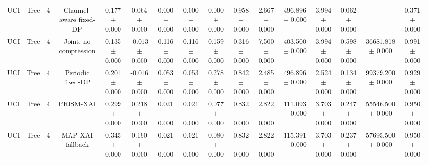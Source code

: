 \begin{tabular}{lccccccccccccccc}
UCI & Tree & 4 & Channel-aware fixed-DP & 0.177 $\pm$ 0.000 & 0.064 $\pm$ 0.000 & 0.000 $\pm$ 0.000 & 0.000 $\pm$ 0.000 & 0.000 $\pm$ 0.000 & 0.958 $\pm$ 0.000 & 2.667 $\pm$ 0.000 & 496.896 $\pm$ 0.000 & 3.994 $\pm$ 0.000 & 0.062 $\pm$ 0.000 & -- & 0.371 $\pm$ 0.000 \\
UCI & Tree & 4 & Joint, no compression & 0.135 $\pm$ 0.000 & -0.013 $\pm$ 0.000 & 0.116 $\pm$ 0.000 & 0.116 $\pm$ 0.000 & 0.159 $\pm$ 0.000 & 0.316 $\pm$ 0.000 & 7.500 $\pm$ 0.000 & 403.500 $\pm$ 0.000 & 3.994 $\pm$ 0.000 & 0.598 $\pm$ 0.000 & 36681.818 $\pm$ 0.000 & 0.991 $\pm$ 0.000 \\
UCI & Tree & 4 & Periodic fixed-DP & 0.201 $\pm$ 0.000 & -0.016 $\pm$ 0.000 & 0.053 $\pm$ 0.000 & 0.053 $\pm$ 0.000 & 0.278 $\pm$ 0.000 & 0.842 $\pm$ 0.000 & 2.485 $\pm$ 0.000 & 496.896 $\pm$ 0.000 & 2.524 $\pm$ 0.000 & 0.134 $\pm$ 0.000 & 99379.200 $\pm$ 0.000 & 0.929 $\pm$ 0.000 \\
UCI & Tree & 4 & PRISM-XAI & 0.299 $\pm$ 0.000 & 0.218 $\pm$ 0.000 & 0.021 $\pm$ 0.000 & 0.021 $\pm$ 0.000 & 0.077 $\pm$ 0.000 & 0.832 $\pm$ 0.000 & 2.822 $\pm$ 0.000 & 111.093 $\pm$ 0.000 & 3.703 $\pm$ 0.000 & 0.247 $\pm$ 0.000 & 55546.500 $\pm$ 0.000 & 0.950 $\pm$ 0.000 \\
UCI & Tree & 4 & MAP-XAI fallback & 0.345 $\pm$ 0.000 & 0.190 $\pm$ 0.000 & 0.021 $\pm$ 0.000 & 0.021 $\pm$ 0.000 & 0.080 $\pm$ 0.000 & 0.832 $\pm$ 0.000 & 2.822 $\pm$ 0.000 & 115.391 $\pm$ 0.000 & 3.703 $\pm$ 0.000 & 0.237 $\pm$ 0.000 & 57695.500 $\pm$ 0.000 & 0.950 $\pm$ 0.000 \\
\bottomrule
\end{tabular}

